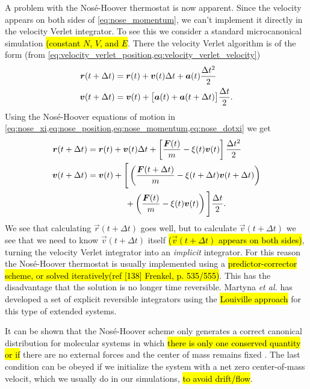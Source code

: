 A problem with the Nosé-Hoover thermostat is now apparent. Since the velocity appears on both sides of \cref{eq:nose_momentum}, we can't implement it directly in the velocity Verlet integrator. To see this we consider a standard microcanonical simulation \hl{(constant $N$, $V$, and $E$}. There the velocity Verlet algorithm is of the form
(from \cref{eq:velocity_verlet_position,eq:velocity_verlet_velocity})
\begin{align*}
    \boldsymbol{r}(t + \Delta t) &= \boldsymbol{r}(t) + \boldsymbol{v}(t)\Delta t + \boldsymbol{a}(t)\frac{\Delta t^2}{2}\\
    \boldsymbol{v}(t + \Delta t) &= \boldsymbol{v}(t) + \big[\boldsymbol{a}(t) + \boldsymbol{a}(t + \Delta t)\big] \frac{\Delta t}{2}.
\end{align*}
Using the Nosé-Hoover equations of motion in \cref{eq:nose_xi,eq:nose_position,eq:nose_momentum,eq:nose_dotxi} we get
\begin{align*}
    \rvec(t + \Delta t) &= \rvec(t) + \vvec(t)\Delta t + \left[ \frac{\vec F(t)}{m} - \xi(t)\vec v(t) \right] \frac{\Delta t^2}{2}\\
    \vvec(t + \Delta t) 
        &= \vvec(t) + \Bigg[ 
            \left(\frac{\vec F(t+\Delta t)}{m} - \xi(t+\Delta t)\vec v(t+\Delta t)\right) \\
            &\phantom{= \vvec(t) + \Big[} + \left(\frac{\vec F(t)}{m} - \xi(t)\vec v(t)\right)
        \Bigg] 
        \frac{\Delta t}{2}.
\end{align*}
We see that calculating $\vec r(t+\Delta t)$ goes well, but to calculate $\vec v(t+\Delta t)$ we see that we need to know $\vec v(t+\Delta t)$ itself \hl{($\vec v(t+\Delta t)$ appears on both sides)}, turning the velocity Verlet integrator into an \emph{implicit} integrator. For this reason the Nosé-Hoover thermostat is usually implemented using a \hl{predictor-corrector scheme, or solved iteratively(ref [138] Frenkel, p. 535/555)}. This has the disadvantage that the solution is no longer time reversible. Martyna \emph{et al.}\cite{martyna1996explicit} has developed a set of explicit reversible integrators using the \hl{Louiville approach} for this type of extended systems.

It can be shown that the Nosé-Hoover scheme only generates a correct canonical distribution for molecular systems in which \hl{there is only one conserved quantity or if} there are no external forces and the center of mass remains fixed \cite{frenkel2001understanding}. The last condition can be obeyed if we initialize the system with a net zero center-of-mass velocit, which we usually do in our simulations, \hl{to avoid drift/flow}.


